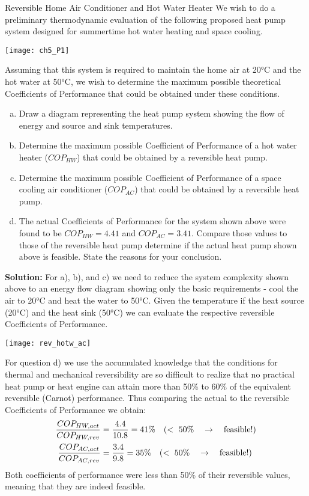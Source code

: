 \begin{example}{Reversible Home Air Conditioner and Hot Water Heater}
  We wish to do a preliminary thermodynamic evaluation of the following proposed heat pump system designed for summertime hot water heating and space cooling.
  \begin{center}
    \texttt{[image: ch5\_P1]}
  \end{center}

  Assuming that this system is required to maintain the home air at 20°C and the hot water at 50°C, we wish to determine the maximum possible theoretical Coefficients of Performance that could be obtained under these conditions.

  \begin{enumerate}[a)]
  \item Draw a diagram representing the heat pump system showing the flow of energy and source and sink temperatures.
  \item Determine the maximum possible Coefficient of Performance of a hot water heater ($COP_{HW}$) that could be obtained by a reversible heat pump.
  \item Determine the maximum possible Coefficient of Performance of a space cooling air conditioner ($COP_{AC}$) that could be obtained by a reversible heat pump.
  \item The actual Coefficients of Performance for the system shown above were found to be $COP_{HW} = 4.41$ and $COP_{AC} = 3.41$.  Compare those values to those of the reversible heat pump determine if the actual heat pump shown above is feasible. State the reasons for your conclusion.
  \end{enumerate}
  {\bf Solution:}
  For a), b), and c) we need to reduce the system complexity shown above to an energy flow diagram showing only the basic requirements - cool the air to 20°C and heat the water to 50°C. Given the temperature if the heat source (20°C) and the heat sink (50°C) we can evaluate the respective reversible Coefficients of Performance.

  \begin{center}
    \texttt{[image: rev\_hotw\_ac]}
  \end{center}

  For question d) we use the accumulated knowledge that the conditions for thermal and mechanical reversibility are so difficult to realize that no practical heat pump or heat engine can attain more than 50\% to 60\% of the equivalent reversible (Carnot) performance. Thus comparing the actual to the reversible Coefficients of Performance we obtain:
  \begin{align*}
    \frac{COP_{HW, act}}{COP_{HW, rev}} &= \frac{4.4}{10.8} = 41\% \quad (<\ 50\%\quad \rightarrow \quad {\rm feasible!}) \\
    \frac{COP_{AC, act}}{COP_{AC, rev}} &= \frac{3.4}{9.8} = 35\% \quad (<\ 50\%\quad \rightarrow \quad {\rm feasible!})
  \end{align*}
  Both coefficients of performance were less than 50\% of their reversible values, meaning that they are indeed feasible.
\end{example}


